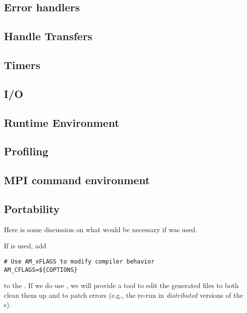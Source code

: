 \documentclass{article}
\begin{document}
\subsection{Error handlers}
\subsection{Handle Transfers}
\subsection{Timers}
\subsection{I/O}  
\subsection{Runtime Environment}
\subsection{Profiling}
\subsection{MPI command environment}

\subsection{Portability}
Here is some discussion on what would be necessary if 
was used.

If  is used, add
\begin{verbatim}
# Use AM_xFLAGS to modify compiler behavior
AM_CFLAGS=${COPTIONS}
\end{verbatim}
to the . 
If we do use , we will provide a tool to edit the generated
files to both clean them up and to patch errors (e.g., the re-run
 in \emph{distributed} versions of the s).
\end{document}
